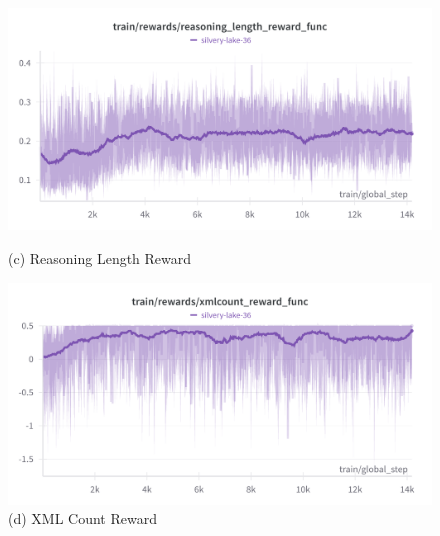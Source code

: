 \documentclass[11pt]{article}
\begin{document}
\begin{itemize}
\begin{figure}[htbp]
    \begin{minipage}{\graphwidthtwo}
        \centering
        \includegraphics[width=\linewidth]{phi/reasoning_length_reward.png} %
        \caption*{(c) Reasoning Length Reward}
    \end{minipage}\hfill
    \begin{minipage}{\graphwidthtwo}
        \centering
        \includegraphics[width=\linewidth]{phi/XML_Count_reward.png} %
        \caption*{(d) XML Count Reward}
    \end{minipage}

    \vspace{1em} %


\end{figure}
\end{itemize}
\end{document}
